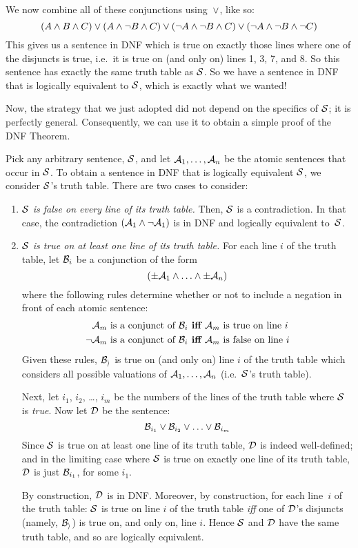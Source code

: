 We now combine all of these conjunctions using~$\vee$, like so:
$$(A \wedge B \wedge C) \vee (A \wedge \neg B \wedge C) \vee (\neg A \wedge \neg B \wedge C) \vee (\neg A \wedge \neg B \wedge \neg C)$$
This gives us a sentence in DNF which is true on exactly those lines where one of the disjuncts is true, i.e.\ it is true on (and only on) lines 1, 3, 7, and 8. So this sentence has exactly the same truth table as $\mathcal{S}$. So we have a sentence in DNF that is logically equivalent to $\mathcal{S}$, which is exactly what we wanted!

Now, the strategy that we just adopted did not depend on the specifics of $\mathcal{S}$; it is perfectly general. Consequently, we can use it to obtain a simple proof of the DNF Theorem.

Pick any arbitrary sentence, $\mathcal{S}$, and let $\mathcal{A}_1, \ldots, \mathcal{A}_n$ be the atomic sentences that occur in $\mathcal{S}$. To obtain a sentence in DNF that is logically equivalent $\mathcal{S}$, we consider $\mathcal{S}$'s truth table. There are two cases to consider:
	\begin{enumerate}
		\item \emph{$\mathcal{S}$ is false on every line of its truth table.} Then, $\mathcal{S}$ is a contradiction. In that case, the contradiction $(\mathcal{A}_1 \wedge \neg \mathcal{A}_1)$ is in DNF and logically equivalent to~$\mathcal{S}$. 
	
		\item \emph{$\mathcal{S}$ is true on at least one line of its truth table.}
		For each line $i$ of the truth table, let $\mathcal{B}_i$ be a conjunction of the form 
		$$(\pm\mathcal{A}_1 \land \ldots \land \pm\mathcal{A}_n)$$
		where the following rules determine whether or not to include a negation in front of each atomic sentence:
			\begin{align*}
				\mathcal{A}_m\text{ is a conjunct of }\mathcal{B}_i&\textbf{ iff }\mathcal{A}_m\text{ is true on line }i\\
				\neg\mathcal{A}_m\text{ is a conjunct of }\mathcal{B}_i&\textbf{ iff }\mathcal{A}_m\text{ is false on line }i
			\end{align*}
		Given these rules, $\mathcal{B_i}$ is true on (and only on) line $i$ of the truth table which considers all possible valuations of $\mathcal{A}_1, \ldots, \mathcal{A}_n$ (i.e.\ $\mathcal{S}$'s truth table). 
		
		Next, let $i_1$, $i_2$, \dots, $i_m$ be the numbers of the lines of the truth table where $\mathcal{S}$ is \emph{true}. Now let $\mathcal{D}$ be the sentence:
		$$\mathcal{B}_{i_1} \vee \mathcal{B}_{i_2} \vee \ldots \vee \mathcal{B}_{i_m}$$
		Since $\mathcal{S}$ is true on at least one line of its truth table, $\mathcal{D}$ is indeed well-defined; and in the limiting case where $\mathcal{S}$ is true on exactly one line of its truth table, $\mathcal{D}$ is just $\mathcal{B}_{i_1}$, for some $i_1$.
		
		By construction, $\mathcal{D}$ is in DNF. Moreover, by construction, for each line~$i$ of the truth table: $\mathcal{S}$ is true on line $i$ of the truth table \emph{iff} one of $\mathcal{D}$'s disjuncts (namely, $\mathcal{B_i}$) is true on, and only on, line $i$. Hence $\mathcal{S}$ and $\mathcal{D}$ have the same truth table, and so are logically equivalent.
	\end{enumerate}
